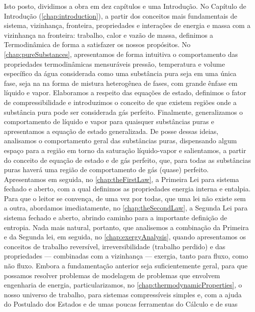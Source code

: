     Isto posto, dividimos a obra em dez capítulos e uma Introdução. No Capítulo
    de Introdução (\cref{chap:introduction}), a partir dos conceitos mais
    fundamentais de sistema, vizinhança, fronteira, propriedades e interações
    de energia e massa com a vizinhança na fronteira: trabalho, calor e vazão
    de massa, definimos a Termodinâmica de forma a satisfazer os nossos
    propósitos. No \cref{chap:pureSubstances}, apresentamos de forma intuitiva
    o comportamento das propriedades termodinâmicas mensuráveis pressão,
    temperatura e volume específico da água considerada como uma substância
    pura seja em uma única fase, seja na na forma de mistura heterogênea de
    fases, com grande ênfase em líquido e vapor.  Elaboramos a respeito das
    equações de estado, definimos o fator de compressibilidade e introduzimos o
    conceito de que existem regiões onde a substância pura pode ser considerada
    gás perfeito.  Finalmente, generalizamos o comportamento de líquido e vapor
    para quaisquer substâncias puras e apresentamos a equação de estado
    generalizada. De posse dessas ideias, analisamos o comportamento geral das
    substâncias puras, dispensando algum espaço para a região em torno da
    saturação líquido-vapor e salientamos, a partir do conceito de equação de
    estado e de gás perfeito, que, para todas as substâncias puras haverá uma
    região de comportamento de gás (quase) perfeito. Apresentamos em seguida,
    no \cref{chap:theFirstLaw}, a Primeira Lei para sistema fechado e aberto,
    com a qual definimos as propriedades energia interna e entalpia. Para que o
    leitor se convença, de uma vez por todas, que uma lei não existe sem a
    outra, abordamos imediatamente, no \cref{chap:theSecondLaw}, a Segunda Lei
    para sistema fechado e aberto, abrindo caminho para a importante definição
    de entropia. Nada mais natural, portanto, que analisemos a combinação da
    Primeira e da Segunda lei, em seguida, no \cref{chap:exergyAnalysis},
    quando apresentamos os conceitos de trabalho reversível, irreversibilidade
    (trabalho perdido) e das propriedades --- combinadas com a vizinhança ---
    exergia, tanto para fluxo, como não fluxo. Embora a fundamentação anterior
    seja suficientemente geral, para que possamos resolver problemas de
    modelagem de problemas que envolvem engenharia de energia,
    particularizamos, no \cref{chap:thermodynamicProperties}, o nosso universo
    de trabalho, para sistemas compressíveis simples e, com a ajuda do
    Postulado dos Estados e de umas poucas ferramentas do Cálculo e de suas
